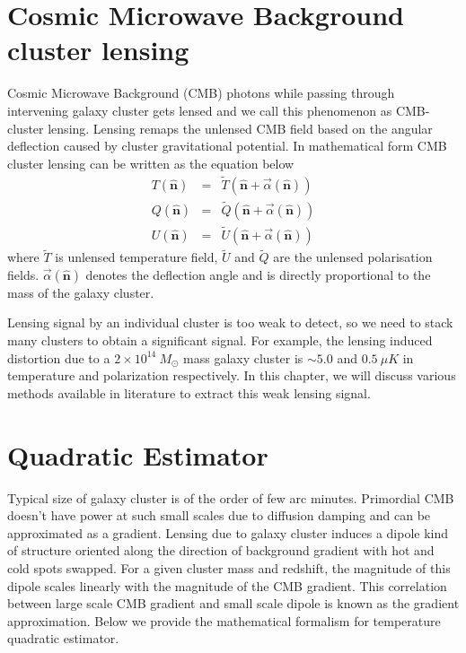 \documentclass[usenatbib, twocolumn, nofootinbib, reprint, emulateapj, amsart]{revtex4-1}
\begin{document}
\section{Cosmic Microwave Background cluster lensing}
Cosmic Microwave Background (CMB) photons while passing through intervening galaxy cluster gets lensed and we call this phenomenon as CMB-cluster lensing.
 Lensing remaps the unlensed CMB field based on the angular deflection caused by cluster gravitational potential.
 In mathematical form CMB cluster lensing can be written as the equation below
 \begin{eqnarray}
T(\hat{\textbf{n}})& = & \widetilde{T} (\hat{\textbf{n}} + \vec{\alpha}(\hat{\textbf{n}}))\\
Q(\hat{\textbf{n}}) & = & \widetilde{Q} (\hat{\textbf{n}} + \vec{\alpha}(\hat{\textbf{n}}))\\
U(\hat{\textbf{n}}) & = & \widetilde{U} (\hat{\textbf{n}} + \vec{\alpha}(\hat{\textbf{n}}))
\end{eqnarray}
where $ \widetilde{T}$ is unlensed temperature field, $\widetilde{U}$ and $\widetilde{Q}$ are the unlensed polarisation fields.
$\vec{\alpha}(\hat{\textbf{n}})$ denotes the deflection angle and is directly proportional to the mass of the galaxy cluster.

Lensing signal by an individual cluster is too weak to detect, so we need to stack many clusters to obtain a significant signal.
 For example, the lensing induced distortion due to a $2 \times 10^{14} \ M_{\odot}$ mass galaxy cluster  is $\sim 5.0$ and $0.5 \ \mu K$ in temperature and polarization respectively.
In this chapter, we will discuss various methods available in literature to extract this weak lensing signal.
\section{Quadratic Estimator}
Typical size of galaxy cluster is of the order of few arc minutes. 
Primordial CMB doesn't have power at such small scales due to diffusion damping \cite{Silk} and can be approximated as a gradient. 
Lensing due to galaxy cluster induces a dipole kind of structure oriented along the direction of background gradient with hot and cold spots swapped.
For a given cluster mass and redshift, the magnitude of this dipole scales linearly with the magnitude of the CMB gradient. 
This correlation between large scale CMB gradient and small scale dipole is known as the gradient approximation.
Below we provide the mathematical formalism for temperature quadratic estimator.%
\end{document}
